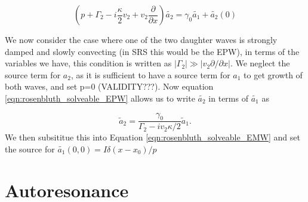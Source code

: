 \begin{equation}\label{eqn:rosenbluth_solveable_EPW}
	\left(p + \Gamma_2 - i\frac{\kappa}{2}v_2 + v_2\frac{\partial}{\partial x}\right)\tilde{a_2} = \gamma_0 \tilde{a_1} + \tilde{a_2}(0)
\end{equation}  

We now consider the case where one of the two daughter waves is strongly damped and slowly convecting (in SRS this would be the EPW), in terms of the variables we have, this condition is written as $|\Gamma_2| \gg |v_2\partial / \partial x|$. We neglect the source term for $a_2$, as it is sufficient to have a source term for $a_1$ to get growth of both waves, and set p=0 (VALIDITY???). Now equation \ref{eqn:rosenbluth_solveable_EPW} allows us to write $\tilde{a_2}$ in terms of $\tilde{a_1}$ as

\begin{equation}
	\tilde{a}_2 = \frac{\gamma_0}{\Gamma_2 - i v_2 \kappa/2}\tilde{a}_1.
\end{equation} We then subsititue this into Equation \ref{eqn:rosenbluth_solveable_EMW} and set the source for $\tilde{a_1}(0,0) = I\delta(x-x_0)/p$







\section{Autoresonance}

%
%
